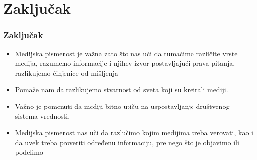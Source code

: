 \documentclass[13pt]{beamer}
\begin{document}
\section{Zaključak}

\begin{frame}[fragile]\frametitle{Zaključak}
		\begin{itemize}	
			\item Medijska pismenost je važna zato što nas uči da tumačimo različite vrste medija, razumemo informacije i njihov izvor postavljajući prava pitanja, razlikujemo činjenice od mišljenja 
			\item  Pomaže nam da razlikujemo stvarnost od sveta koji su kreirali mediji.
			\item Važno je pomenuti da mediji bitno utiču na uspostavljanje društvenog sistema vrednosti. 
		\item Medijska pismenost nas uči da razlučimo kojim medijima treba verovati, kao i da uvek treba proveriti određenu informaciju, pre nego što je objavimo ili podelimo
        \end{itemize}
\end{frame}
\end{document}
